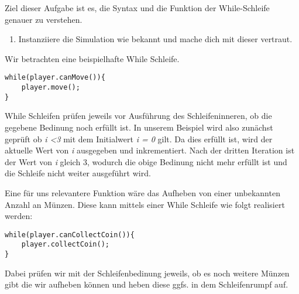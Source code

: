 

Ziel dieser Aufgabe ist es, die Syntax und die Funktion der While-Schleife genauer zu verstehen.

\begin{enumerate}
    \item Instanziiere die Simulation wie bekannt und mache dich mit dieser vertraut.
\end{enumerate}


\begin{Infobox}
    Wir betrachten eine beispielhafte While Schleife.

    \begin{lstlisting}[breaklines=true, numbers=none]
while(player.canMove()){
    player.move();
}
    \end{lstlisting}

    While Schleifen prüfen jeweils vor Ausführung des Schleifeninneren, ob die gegebene Bedinung noch erfüllt ist. 
    In unserem Beispiel wird also zunächst geprüft ob \textit{i \textless 3} mit dem Initialwert \textit{i = 0} gilt. 
    Da dies erfüllt ist, wird der aktuelle Wert von \textit{i} ausgegeben und inkrementiert. 
    Nach der dritten Iteration ist der Wert von \textit{i} gleich 3, wodurch die obige Bedinung nicht mehr erfüllt ist und die Schleife nicht weiter ausgeführt wird. 
    
    Eine für uns relevantere Funktion wäre das Aufheben von einer unbekannten Anzahl an Münzen. 
    Diese kann mittels einer While Schleife wie folgt realisiert werden:

    \begin{lstlisting}[breaklines=true, numbers=none]
while(player.canCollectCoin()){
    player.collectCoin();
}
    \end{lstlisting}

    Dabei prüfen wir mit der Schleifenbedinung jeweils, ob es noch weitere Münzen gibt die wir aufheben können und heben diese ggfs. in dem Schleifenrumpf auf.
\end{Infobox}


